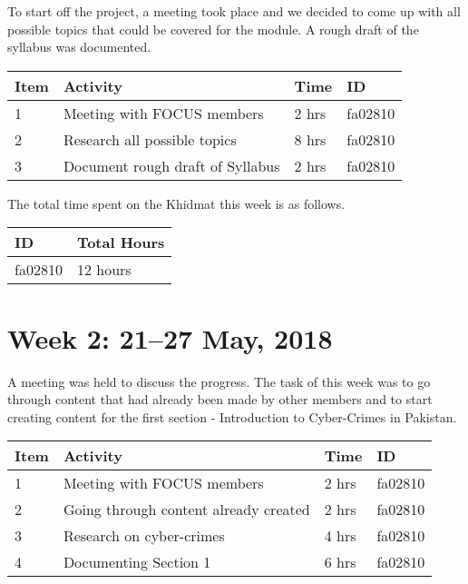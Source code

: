 \documentclass{article}
\begin{document}
To start off the project, a meeting took place and we decided to come up with all possible topics that could be covered for the module. A rough draft of the syllabus was documented. \newline

\begin{tabular}{|l|l|l|l|}
  \hline
  Item 	& Activity & Time & ID \\\hline\hline
  1	& Meeting with FOCUS members & 2 hrs & fa02810 \\\hline
  2	& Research all possible topics & 8 hrs & fa02810 \\\hline
  3	& Document rough draft of Syllabus & 2 hrs & fa02810 \\\hline
\end{tabular} \newline

The total time spent on the Khidmat this week is as follows. \newline

\begin{tabular}{|l|l|}
  \hline
  ID & Total Hours\\\hline\hline
  fa02810 & 12 hours\\\hline
\end{tabular}

\newpage %
\section*{Week 2: 21--27 May, 2018}

A meeting was held to discuss the progress. The task of this week was to go through content that had already been made by other members and to start creating content for the first section - Introduction to Cyber-Crimes in Pakistan. \newline

\begin{tabular}{|l|l|l|l|}
  \hline
  Item 	& Activity & Time & ID \\\hline\hline
  1	& Meeting with FOCUS members & 2 hrs & fa02810 \\\hline
  2	& Going through content already created & 2 hrs & fa02810 \\\hline
  3	& Research on cyber-crimes & 4 hrs & fa02810\\\hline
  4 & Documenting Section 1 & 6 hrs & fa02810 \\\hline
\end{tabular} \newline
\end{document}
